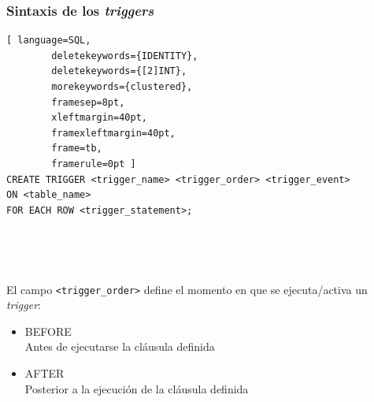 \documentclass[
	10pt, %
	aspectratio=169, %
]{beamer}
\begin{document}

\begin{frame}[fragile]
	
	\frametitle{Sintaxis de los \emph{triggers}}
	
	\begin{lstlisting}[ language=SQL,
		deletekeywords={IDENTITY},
		deletekeywords={[2]INT},
		morekeywords={clustered},
		framesep=8pt,
		xleftmargin=40pt,
		framexleftmargin=40pt,
		frame=tb,
		framerule=0pt ]
CREATE TRIGGER <trigger_name> <trigger_order> <trigger_event> 
ON <table_name> 
FOR EACH ROW <trigger_statement>;
\end{lstlisting}

	\ 
	
	\ 
	
	\pause
	
	El campo \texttt{<trigger\_order>} define el momento en que se ejecuta/activa un \emph{trigger}:
	
	\begin{itemize}
		
		\item \textcolor{codepurple}{BEFORE} 
		\\ Antes de ejecutarse la cláusula definida
		
		\item \textcolor{codepurple}{AFTER} 
		\\ Posterior a la ejecución de la cláusula definida
		
	\end{itemize}
	
\end{frame}

\end{document}
